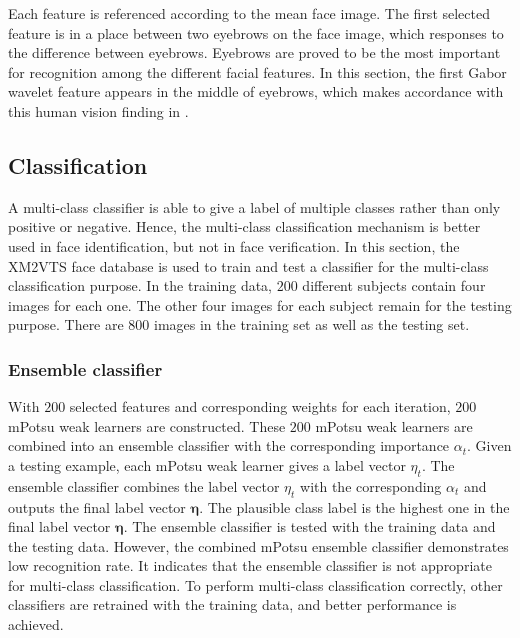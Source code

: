 Each feature is referenced according to the mean face image. The first selected feature is in a place between two eyebrows on the face image, which responses to the difference between eyebrows. Eyebrows are proved to be the most important for recognition among the different facial features. In this section, the first Gabor wavelet feature appears in the middle of eyebrows, which makes accordance with this human vision finding in \cite{Sinha2006}.

\subsection{Classification}
A multi-class classifier is able to give a label of multiple classes rather than only positive or negative. Hence, the multi-class classification mechanism is better used in face identification, but not in face verification. In this section, the \mbox{XM2VTS} face database is used to train and test a classifier for the multi-class classification purpose. In the training data, $200$ different subjects contain four images for each one. The other four images for each subject remain for the testing purpose. There are $800$ images in the training set as well as the testing set. 

\subsubsection{Ensemble classifier}
With $200$ selected features and corresponding weights for each iteration, $200$ mPotsu weak learners are constructed.  These $200$ mPotsu weak learners are combined into an ensemble classifier with the corresponding importance $\alpha_t$. Given a testing example, each mPotsu weak learner gives a label vector $\eta_t$. The ensemble classifier combines the label vector $\eta_t$ with the corresponding $\alpha_t$ and outputs the final label vector $\boldsymbol{\eta}$. The plausible class label is the highest one in the final label vector $\boldsymbol{\eta}$. The ensemble classifier is tested with the training data and the testing data. However, the combined mPotsu ensemble classifier demonstrates low recognition rate. It indicates that the ensemble classifier is not appropriate for multi-class classification. To perform multi-class classification correctly, other classifiers are retrained with the training data, and better performance is achieved.


